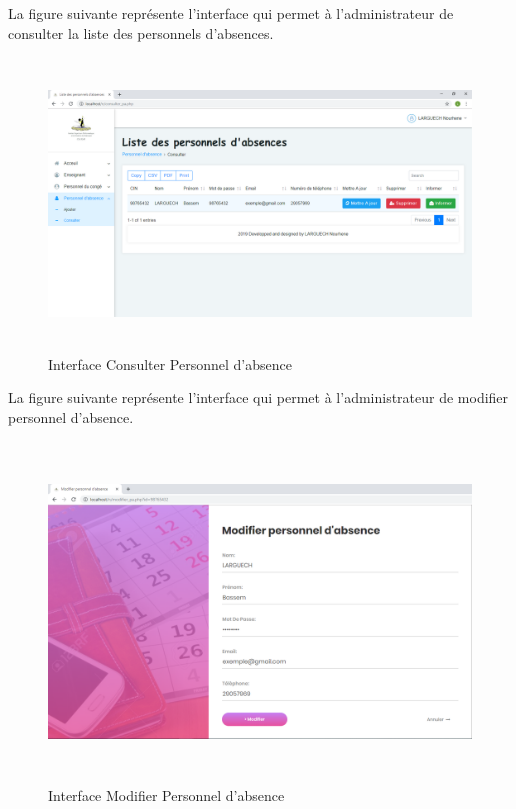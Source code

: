 \documentclass[12 pt ]{report}
\begin{document}
La figure suivante représente l'interface qui permet à l'administrateur de consulter la liste des personnels d'absences.
\begin{figure}[h]
 \begin{center}
\includegraphics[width= 16 cm ,height=  7.75cm]{consulter_pa.PNG}
\caption{Interface Consulter Personnel d'absence}

\end{center}
\end{figure}
\newpage
La figure suivante représente l'interface qui permet à l'administrateur de modifier  personnel d'absence.
\begin{figure}[h]
 \begin{center}
\includegraphics[width= 18 cm ,height=  9cm]{modifier_pa.PNG}
\caption{Interface Modifier Personnel d'absence}

\end{center}
\end{figure}\\
\end{document}
